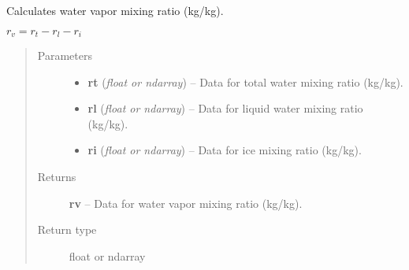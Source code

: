 \documentclass[letterpaper,10pt,english]{sphinxmanual}
\begin{document}
\begin{fulllineitems}
\label{atmos:atmos.equations.rv_from_rt_rl_ri}
Calculates water vapor mixing ratio (kg/kg).

\(r_v = r_t-r_l-r_i\)
\begin{quote}\begin{description}
\item[{Parameters}] \leavevmode\begin{itemize}
\item {} 
\textbf{rt} (\emph{float or ndarray}) -- Data for total water mixing ratio (kg/kg).

\item {} 
\textbf{rl} (\emph{float or ndarray}) -- Data for liquid water mixing ratio (kg/kg).

\item {} 
\textbf{ri} (\emph{float or ndarray}) -- Data for ice mixing ratio (kg/kg).

\end{itemize}

\item[{Returns}] \leavevmode
\textbf{rv} --
Data for water vapor mixing ratio (kg/kg).

\item[{Return type}] \leavevmode
float or ndarray

\end{description}\end{quote}

\end{fulllineitems}

\end{document}
